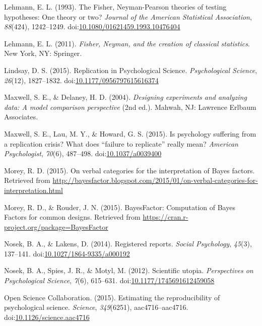 \documentclass[,man, mask]{apa6}
\theoremstyle{definition}
\theoremstyle{definition}
\theoremstyle{definition}
\theoremstyle{remark}
\begin{document}
\hypertarget{ref-Lehmann1993}{}
Lehmann, E. L. (1993). The Fisher, Neyman-Pearson theories of testing
hypotheses: One theory or two? \emph{Journal of the American Statistical
Association}, \emph{88}(424), 1242--1249.
doi:\href{https://doi.org/10.1080/01621459.1993.10476404}{10.1080/01621459.1993.10476404}

\hypertarget{ref-Lehmann2011}{}
Lehmann, E. L. (2011). \emph{Fisher, Neyman, and the creation of
classical statistics}. New York, NY: Springer.

\hypertarget{ref-Lindsay2015}{}
Lindsay, D. S. (2015). Replication in Psychological Science.
\emph{Psychological Science}, \emph{26}(12), 1827--1832.
doi:\href{https://doi.org/10.1177/0956797615616374}{10.1177/0956797615616374}

\hypertarget{ref-Maxwell2004}{}
Maxwell, S. E., \& Delaney, H. D. (2004). \emph{Designing experiments
and analyzing data: A model comparison perspective} (2nd ed.). Mahwah,
NJ: Lawrence Erlbaum Associates.

\hypertarget{ref-Maxwell2015}{}
Maxwell, S. E., Lau, M. Y., \& Howard, G. S. (2015). Is psychology
suffering from a replication crisis? What does ``failure to replicate''
really mean? \emph{American Psychologist}, \emph{70}(6), 487--498.
doi:\href{https://doi.org/10.1037/a0039400}{10.1037/a0039400}

\hypertarget{ref-Morey2015c}{}
Morey, R. D. (2015). On verbal categories for the interpretation of
Bayes factors. Retrieved from
\url{http://bayesfactor.blogspot.com/2015/01/on-verbal-categories-for-interpretation.html}

\hypertarget{ref-Morey2015b}{}
Morey, R. D., \& Rouder, J. N. (2015). BayesFactor: Computation of Bayes
Factors for common designs. Retrieved from
\url{https://cran.r-project.org/package=BayesFactor}

\hypertarget{ref-Nosek2014}{}
Nosek, B. A., \& Lakens, D. (2014). Registered reports. \emph{Social
Psychology}, \emph{45}(3), 137--141.
doi:\href{https://doi.org/10.1027/1864-9335/a000192}{10.1027/1864-9335/a000192}

\hypertarget{ref-Nosek2012}{}
Nosek, B. A., Spies, J. R., \& Motyl, M. (2012). Scientific utopia.
\emph{Perspectives on Psychological Science}, \emph{7}(6), 615--631.
doi:\href{https://doi.org/10.1177/1745691612459058}{10.1177/1745691612459058}

\hypertarget{ref-OpenScienceCollaboration2015}{}
Open Science Collaboration. (2015). Estimating the reproducibility of
psychological science. \emph{Science}, \emph{349}(6251),
aac4716--aac4716.
doi:\href{https://doi.org/10.1126/science.aac4716}{10.1126/science.aac4716}
\end{document}

